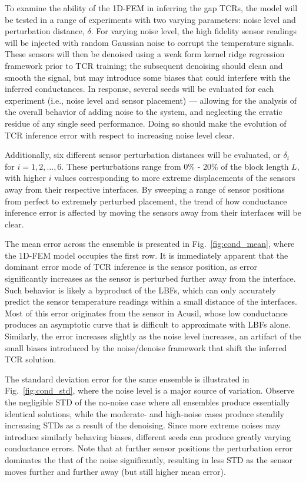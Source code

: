 To examine the ability of the 1D-FEM in inferring the gap TCRs, the model will be tested in a range of experiments with two varying parameters: noise level and perturbation distance, $\delta$. For varying noise level, the high fidelity sensor readings will be injected with random Gaussian noise to corrupt the temperature signals. These sensors will then be denoised using a weak form kernel ridge regression framework \cite{kreider2026} prior to TCR training; the subsequent denoising should clean and smooth the signal, but may introduce some biases that could interfere with the inferred conductances. In response, several seeds will be evaluated for each experiment (i.e., noise level and sensor placement) --- allowing for the analysis of the overall behavior of adding noise to the system, and neglecting the erratic residue of any single seed performance. Doing so should make the evolution of TCR inference error with respect to increasing noise level clear. 

Additionally, six different sensor perturbation distances will be evaluated, or $\delta_i$ for $i=1,2,\dots,6$. These perturbations range from 0\% - 20\% of the block length $L$, with higher $i$ values corresponding to more extreme displacements of the sensors away from their respective interfaces. By sweeping a range of sensor positions from perfect to extremely perturbed placement, the trend of how conductance inference error is affected by moving the sensors away from their interfaces will be clear. 

The mean error across the ensemble is presented in Fig.~\ref{fig:cond_mean}, where the 1D-FEM model occupies the first row. It is immediately apparent that the dominant error mode of TCR inference is the sensor position, as error significantly increases as the sensor is perturbed further away from the interface. Such behavior is likely a byproduct of the LBFs, which can only accurately predict the sensor temperature readings within a small distance of the interfaces. Most of this error originates from the sensor in Acusil, whose low conductance produces an asymptotic curve that is difficult to approximate with LBFs alone. Similarly, the error increases slightly as the noise level increases, an artifact of the small biases introduced by the noise/denoise framework that shift the inferred TCR solution.

The standard deviation error for the same ensemble is illustrated in Fig.~\ref{fig:cond_std}, where the noise level is a major source of variation. Observe the negligible STD of the no-noise case where all ensembles produce essentially identical solutions, while the moderate- and high-noise cases produce steadily increasing STDs as a result of the denoising. Since more extreme noises may introduce similarly behaving biases, different seeds can produce greatly varying conductance errors. Note that at further sensor positions the perturbation error dominates the that of the noise significantly, resulting in less STD as the sensor moves further and further away (but still higher mean error). 

